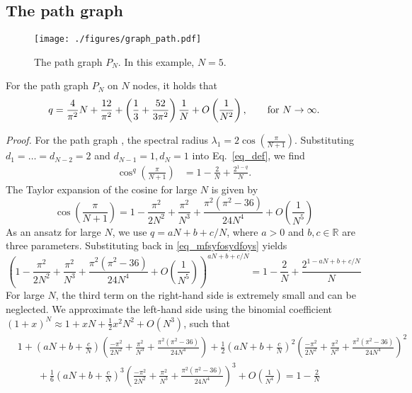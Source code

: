 \documentclass{comnet}%
\begin{document}
\subsection{The path graph}
\begin{figure}[!ht]
	\centering
	\texttt{[image: ./figures/graph\_path.pdf]}
	\caption{The path graph $P_N$. In this example, $N=5$.}
	\label{fig_path_graph}
\end{figure}
\begin{theorem}
	For the path graph $P_N$ on $N$ nodes, it holds that
	\begin{equation}\label{eq_q_path}
		q =\frac{4}{\pi^2} N + \frac{12}{\pi^2} + \left( \frac{1}{3} + \frac{52}{3\pi^{2}} \right) \frac{1}{N} + O\left(\frac{1}{N^2}\right), \qquad \textnormal{for } N \to\infty.
	\end{equation}
\end{theorem}
\textit{Proof.} For the path graph \cite{BrouwerHaemers}, the spectral radius $\lambda_1 = 2 \cos\left(\frac{\pi}{N+1}\right)$. Substituting $d_1 = \ldots = d_{N-2} = 2$ and $d_{N-1} = 1, d_N = 1$ into Eq.\ \eqref{eq_def}, we find
\begin{align}\label{eq_mfsyfosydfoys}
	\cos^q\left(\frac{\pi}{N+1}\right) &= 1 - \frac{2}{N} + \frac{2^{1-q}}{N}.
\end{align}
The Taylor expansion of the cosine for large $N$ is given by
\begin{equation*}
	\cos\left(\frac{\pi}{N+1}\right) = 1 - \frac{\pi^2}{2N^2} + \frac{\pi^2}{N^3} + \frac{\pi^2(\pi^2-36)}{24N^4} + O\left(\frac{1}{N^5}\right)
\end{equation*}
As an ansatz for large $N$, we use $q = a N + b + c/N$, where $a>0$ and $b,c \in \mathbb{R}$ are three parameters. Substituting back in \eqref{eq_mfsyfosydfoys} yields
\begin{equation*}
	\left( 1 - \frac{\pi^2}{2N^2} + \frac{\pi^2}{N^3} + \frac{\pi^2(\pi^2-36)}{24N^4} + O\left(\frac{1}{N^5}\right) \right)^{aN+b+c/N} = 1 - \frac{2}{N} + \frac{2^{1-aN+b+c/N}}{N}
\end{equation*}
For large $N$, the third term on the right-hand side is extremely small and can be neglected. We approximate the left-hand side using the binomial coefficient $(1+x)^N \approx 1 + xN + \frac{1}{2} x^2 N^2 + O(N^3)$, such that
\begin{align*}
	&1 + \left(aN+b+\frac{c}{N} \right) \left( \frac{-\pi^2}{2N^2} + \frac{\pi^2}{N^3} + \frac{\pi^2(\pi^2-36)}{24N^4} \right) + \frac{1}{2} \left(aN+b+\frac{c}{N} \right)^2 \left( \frac{-\pi^2}{2N^2} + \frac{\pi^2}{N^3} + \frac{\pi^2(\pi^2-36)}{24N^4} \right)^2 \\
	&\qquad + \frac{1}{6} \left(aN+b+\frac{c}{N} \right)^3 \left( \frac{-\pi^2}{2N^2} + \frac{\pi^2}{N^3} + \frac{\pi^2(\pi^2-36)}{24N^4} \right)^3 + O\left(\frac{1}{N^4}\right) = 1 - \frac{2}{N}
\end{align*}
\end{document}
